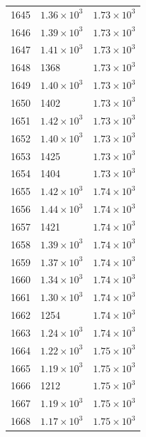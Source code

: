 \begin{table}[H]
\begin{tabular}{lll}
1645 & $\displaystyle 1.36 \times 10^{3}$ & $\displaystyle 1.73 \times 10^{3}$ \\
1646 & $\displaystyle 1.39 \times 10^{3}$ & $\displaystyle 1.73 \times 10^{3}$ \\
1647 & $\displaystyle 1.41 \times 10^{3}$ & $\displaystyle 1.73 \times 10^{3}$ \\
1648 & 1368 & $\displaystyle 1.73 \times 10^{3}$ \\
1649 & $\displaystyle 1.40 \times 10^{3}$ & $\displaystyle 1.73 \times 10^{3}$ \\
1650 & 1402 & $\displaystyle 1.73 \times 10^{3}$ \\
1651 & $\displaystyle 1.42 \times 10^{3}$ & $\displaystyle 1.73 \times 10^{3}$ \\
1652 & $\displaystyle 1.40 \times 10^{3}$ & $\displaystyle 1.73 \times 10^{3}$ \\
1653 & 1425 & $\displaystyle 1.73 \times 10^{3}$ \\
1654 & 1404 & $\displaystyle 1.73 \times 10^{3}$ \\
1655 & $\displaystyle 1.42 \times 10^{3}$ & $\displaystyle 1.74 \times 10^{3}$ \\
1656 & $\displaystyle 1.44 \times 10^{3}$ & $\displaystyle 1.74 \times 10^{3}$ \\
1657 & 1421 & $\displaystyle 1.74 \times 10^{3}$ \\
1658 & $\displaystyle 1.39 \times 10^{3}$ & $\displaystyle 1.74 \times 10^{3}$ \\
1659 & $\displaystyle 1.37 \times 10^{3}$ & $\displaystyle 1.74 \times 10^{3}$ \\
1660 & $\displaystyle 1.34 \times 10^{3}$ & $\displaystyle 1.74 \times 10^{3}$ \\
1661 & $\displaystyle 1.30 \times 10^{3}$ & $\displaystyle 1.74 \times 10^{3}$ \\
1662 & 1254 & $\displaystyle 1.74 \times 10^{3}$ \\
1663 & $\displaystyle 1.24 \times 10^{3}$ & $\displaystyle 1.74 \times 10^{3}$ \\
1664 & $\displaystyle 1.22 \times 10^{3}$ & $\displaystyle 1.75 \times 10^{3}$ \\
1665 & $\displaystyle 1.19 \times 10^{3}$ & $\displaystyle 1.75 \times 10^{3}$ \\
1666 & 1212 & $\displaystyle 1.75 \times 10^{3}$ \\
1667 & $\displaystyle 1.19 \times 10^{3}$ & $\displaystyle 1.75 \times 10^{3}$ \\
1668 & $\displaystyle 1.17 \times 10^{3}$ & $\displaystyle 1.75 \times 10^{3}$ \\

\end{tabular}
\end{table}
